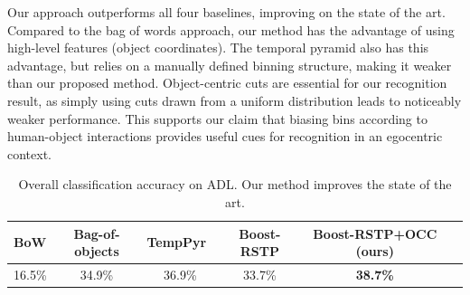 \documentclass[12pt]{article} %
\begin{document}
  Our approach outperforms all four baselines, improving on the state of the art.
  Compared to the bag of words approach, our method has the advantage of using
  high-level features (object coordinates). The temporal pyramid also has this
  advantage, but relies on a manually defined binning structure, making it
  weaker than our proposed method. Object-centric cuts are essential for our
  recognition result, as simply using cuts drawn from a uniform distribution
  leads to noticeably weaker performance. This supports our claim that biasing
  bins according to human-object interactions provides useful cues for
  recognition in an egocentric context.

    \begin{table}
		\begin{center}
			\begin{tabular}{|l|c|c|c|c|c|}
				\hline
        BoW & Bag-of-objects & TempPyr~\cite{Ramanan12} & Boost-RSTP & Boost-RSTP+OCC (ours) \\
				\hline\hline
        16.5\% & 34.9\% & 36.9\% & 33.7\% & \textbf{38.7\%}\\
				\hline
			\end{tabular}
		\end{center}
		\caption{Overall classification accuracy on ADL. Our method improves the state of the art.}\label{table:results}
	\end{table}
\end{document}
